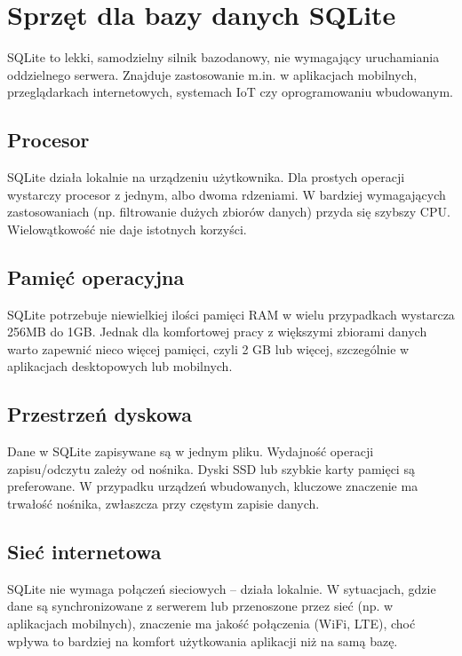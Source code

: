 \documentclass[a4paper,11pt,polish]{sphinxmanual}
\begin{document}
\section{Sprzęt dla bazy danych SQLite}
\label{\detokenize{Sprzet-dla-bazy-danych/source/SprzetDlaBazyDanych:sprzet-dla-bazy-danych-sqlite}}
\sphinxAtStartPar
SQLite to lekki, samodzielny silnik bazodanowy, nie wymagający uruchamiania oddzielnego serwera. Znajduje zastosowanie m.in. w aplikacjach mobilnych, przeglądarkach internetowych, systemach IoT czy oprogramowaniu wbudowanym.


\subsection{Procesor}
\label{\detokenize{Sprzet-dla-bazy-danych/source/SprzetDlaBazyDanych:id1}}
\sphinxAtStartPar
SQLite działa lokalnie na urządzeniu użytkownika. Dla prostych operacji wystarczy procesor z jednym, albo dwoma rdzeniami. W bardziej wymagających zastosowaniach (np. filtrowanie dużych zbiorów danych) przyda się szybszy CPU. Wielowątkowość nie daje istotnych korzyści.


\subsection{Pamięć operacyjna}
\label{\detokenize{Sprzet-dla-bazy-danych/source/SprzetDlaBazyDanych:id2}}
\sphinxAtStartPar
SQLite potrzebuje niewielkiej ilości pamięci RAM w wielu przypadkach wystarcza 256MB do 1GB. Jednak dla komfortowej pracy z większymi zbiorami danych warto zapewnić nieco więcej pamięci, czyli 2 GB lub więcej, szczególnie w aplikacjach desktopowych lub mobilnych.


\subsection{Przestrzeń dyskowa}
\label{\detokenize{Sprzet-dla-bazy-danych/source/SprzetDlaBazyDanych:id3}}
\sphinxAtStartPar
Dane w SQLite zapisywane są w jednym pliku. Wydajność operacji zapisu/odczytu zależy od nośnika. Dyski SSD lub szybkie karty pamięci są preferowane. W przypadku urządzeń wbudowanych, kluczowe znaczenie ma trwałość nośnika, zwłaszcza przy częstym zapisie danych.


\subsection{Sieć internetowa}
\label{\detokenize{Sprzet-dla-bazy-danych/source/SprzetDlaBazyDanych:id4}}
\sphinxAtStartPar
SQLite nie wymaga połączeń sieciowych – działa lokalnie. W sytuacjach, gdzie dane są synchronizowane z serwerem lub przenoszone przez sieć (np. w aplikacjach mobilnych), znaczenie ma jakość połączenia (Wi\sphinxhyphen{}Fi, LTE), choć wpływa to bardziej na komfort użytkowania aplikacji niż na samą bazę.
\end{document}
